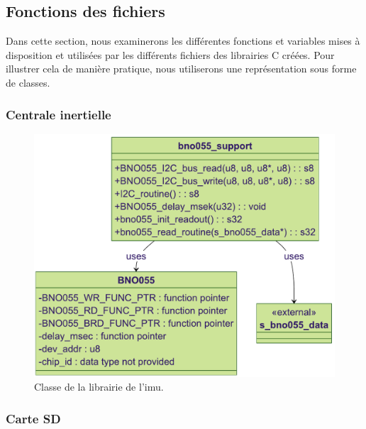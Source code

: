 \clearpage

\subsection{Fonctions des fichiers}
Dans cette section, nous examinerons les différentes fonctions et variables mises à disposition et utilisées par les différents fichiers des librairies C créées. Pour illustrer cela de manière pratique, nous utiliserons une représentation sous forme de classes.

\subsubsection{Centrale inertielle}

\begin{figure}[H]
	\centering
	\includegraphics[width=1\linewidth]{../figures/code/diagrammes/bno-support-class}
	\caption{Classe de la librairie de l'\gls{imu}.}
	\label{fig:bno-support-class}
\end{figure}

\subsubsection{Carte SD}

